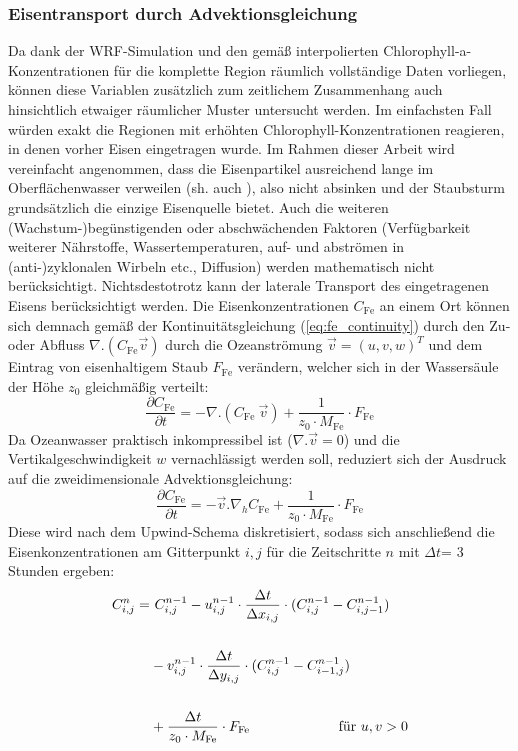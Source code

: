 \documentclass[12pt,a4paper,onecolumn,draft]{scrartcl}
\begin{document}
\subsubsection{Eisentransport durch Advektionsgleichung} \label{sec:methods_advection}
Da dank der WRF-Simulation und den gemäß \citet{Saulquin.2019} interpolierten Chlorophyll-a-Konzentrationen für die komplette Region räumlich vollständige Daten vorliegen, können diese Variablen zusätzlich zum zeitlichem Zusammenhang auch hinsichtlich etwaiger räumlicher Muster untersucht werden. Im einfachsten Fall würden exakt die Regionen mit erhöhten Chlorophyll-Konzentrationen reagieren, in denen vorher Eisen eingetragen wurde. Im Rahmen dieser Arbeit wird vereinfacht angenommen, dass die Eisenpartikel ausreichend lange im Oberflächenwasser verweilen (sh. auch \citet{Cropp.2013}), also nicht absinken und der Staubsturm grundsätzlich die einzige Eisenquelle bietet. Auch die weiteren (Wachstum-)begünstigenden oder abschwächenden Faktoren (Verfügbarkeit weiterer Nährstoffe, Wassertemperaturen, auf- und abströmen in (anti-)zyklonalen Wirbeln etc., Diffusion) werden mathematisch nicht berücksichtigt. Nichtsdestotrotz kann der laterale Transport des eingetragenen Eisens berücksichtigt werden. Die Eisenkonzentrationen $C_\text{Fe}$ an einem Ort können sich demnach gemäß der Kontinuitätsgleichung (\ref{eq:fe_continuity}) durch den Zu- oder Abfluss $\nabla . (C_\text{Fe} \vec{v})$ durch die Ozeanströmung $\vec{v} = (u,v,w)^T$  und dem Eintrag von eisenhaltigem Staub $F_\text{Fe}$ verändern, welcher sich in der Wassersäule der Höhe $z_0$ gleichmäßig verteilt:
\begin{equation}
\frac{\partial C_\text{Fe}}{\partial t} = - \nabla . (C_\text{Fe} \ \vec{v}) + \frac{1}{z_0 \cdot M_\text{Fe}} \cdot F_\text{Fe} \label{eq:fe_continuity}
\end{equation}
Da Ozeanwasser praktisch inkompressibel ist ($\nabla . \vec{v}=0$) und die Vertikalgeschwindigkeit $w$ vernachlässigt werden soll, reduziert sich der Ausdruck auf die zweidimensionale Advektionsgleichung:
\begin{equation}
\frac{\partial C_\text{Fe}}{\partial t} = - \vec{v} . \nabla_h  C_\text{Fe}  + \frac{1}{z_0 \cdot M_\text{Fe}} \cdot F_\text{Fe}
\end{equation}
Diese wird nach dem Upwind-Schema diskretisiert, sodass sich anschließend die Eisenkonzentrationen am Gitterpunkt $i,j$ für die Zeitschritte $n$ mit $\Delta t$= 3 Stunden ergeben:
\begin{equation}
\begin{split}
C_{i,j}^n = &\ C_{i,j}^{n-1} - u_{i,j}^{n-1} \cdot \frac{\Delta t}{\Delta x_{i,j}} \cdot (C_{i,j}^{n-1} - C_{i,j-1}^{n-1}) \\\\
&- v_{i,j}^{n-1} \cdot \frac{\Delta t}{\Delta y_{i,j}} \cdot (C_{i,j}^{n-1} - C_{i-1,j}^{n-1})  \\\\
&+ \frac{\Delta t}{z_0 \cdot M_\text{Fe}} \cdot F_\text{Fe} \text{ \qquad  \qquad \qquad für } u,v > 0 \\\\
\end{split}
\end{equation}
\end{document}
